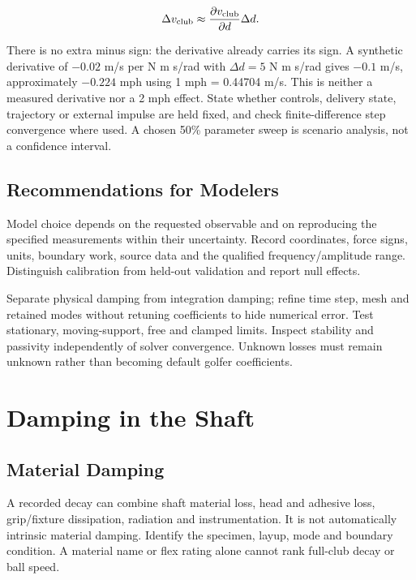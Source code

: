 \[
\Delta v_{\rm club}\approx\frac{\partial v_{\rm club}}{\partial d}\Delta d.
\]

There is no extra minus sign: the derivative already carries its sign. A synthetic derivative of \(-0.02\) m/s per N m s/rad with \(\Delta d=5\) N m s/rad gives \(-0.1\) m/s, approximately \(-0.224\) mph using 1 mph = 0.44704 m/s. This is neither a measured derivative nor a 2 mph effect. State whether controls, delivery state, trajectory or external impulse are held fixed, and check finite-difference step convergence where used. A chosen 50\% parameter sweep is scenario analysis, not a confidence interval.

\subsection{Recommendations for
Modelers}\label{recommendations-for-modelers}

Model choice depends on the requested observable and on reproducing the specified measurements within their uncertainty. Record coordinates, force signs, units, boundary work, source data and the qualified frequency/amplitude range. Distinguish calibration from held-out validation and report null effects.

Separate physical damping from integration damping; refine time step, mesh and retained modes without retuning coefficients to hide numerical error. Test stationary, moving-support, free and clamped limits. Inspect stability and passivity independently of solver convergence. Unknown losses must remain unknown rather than becoming default golfer coefficients.

\section{Damping in the Shaft}\label{sec:shaft_damping}\label{damping-in-the-shaft}

\subsection{Material Damping}\label{material-damping}

A recorded decay can combine shaft material loss, head and adhesive loss, grip/fixture dissipation, radiation and instrumentation. It is not automatically intrinsic material damping. Identify the specimen, layup, mode and boundary condition. A material name or flex rating alone cannot rank full-club decay or ball speed.

